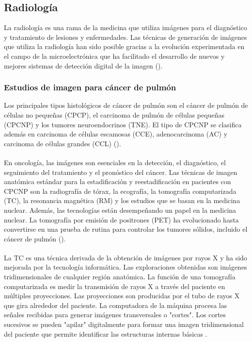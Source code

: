 \documentclass[11pt,a4paper,openany]{article}
\begin{document}
    \subsection{Radiología}
    La radiología es una rama de la medicina que utiliza imágenes para el diagnóstico y tratamiento de lesiones y enfermedades. Las técnicas de generación de imágenes que utiliza la radiología han sido posible gracias a la evolución experimentada en el campo de la microelectrónica que ha facilitado el desarrollo de nuevos y mejores sistemas de detección digital de la imagen (\cite{Silva2019}).
    
        \subsubsection{Estudios de imagen para cáncer de pulmón}
        Los principales tipos histológicos de cáncer de pulmón son el cáncer de pulmón de células no pequeñas (CPCP), el carcinoma de pulmón de células pequeñas (CPCNP) y los tumores neuroendocrinos (TNE). El tipo de CPCNP se clasifica además en carcinoma de células escamosas (CCE), adenocarcinoma (AC) y carcinoma de células grandes (CCL) (\cite{ambrosini_petct_2012}). \\
        \\
        En oncología, las imágenes son esenciales en la detección, el diagnóstico, el seguimiento del tratamiento y el pronóstico del cáncer. Las técnicas de imagen anatómica estándar para la estadificación y reestadificación en pacientes con CPCNP son la radiografía de tórax, la ecografía, la tomografía computarizada (TC), la resonancia magnética (RM) y los estudios que se basan en la medicina nuclear. Además, las tecnologías están desempeñando un papel en la medicina nuclear. La tomografía por emisión de positrones (PET) ha evolucionado hasta convertirse en una prueba de rutina para controlar los tumores sólidos, incluido el cáncer de pulmón (\cite{ambrosini_petct_2012}).\\
        
        \\
        La TC es una técnica derivada de la obtención de imágenes por rayos X y ha sido mejorada por la tecnología informática. Las exploraciones obtenidas son imágenes tridimensionales de cualquier región anatómica. La función de una tomografía computarizada es medir la transmisión de rayos X a través del paciente en múltiples proyecciones. Las proyecciones son producidas por el tubo de rayos X que gira alrededor del paciente. La computadora de la máquina procesa las señales recibidas para generar imágenes transversales o "cortes". Los cortes sucesivos se pueden "apilar" digitalmente para formar una imagen tridimensional del paciente que permite identificar las estructuras internas básicas \cite{Calzado2010}.\\
\end{document}
